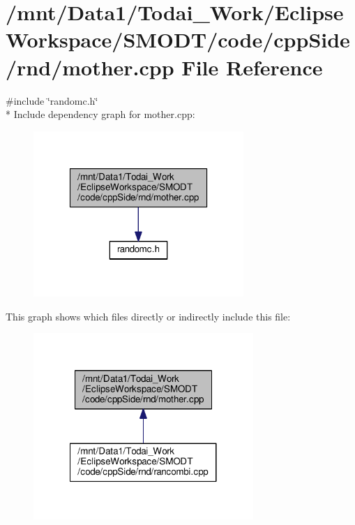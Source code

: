\section{/mnt/\-Data1/\-Todai\-\_\-\-Work/\-Eclipse\-Workspace/\-S\-M\-O\-D\-T/code/cpp\-Side/rnd/mother.cpp File Reference}
\label{rnd_2mother_8cpp}
{\ttfamily \#include \char`\"{}randomc.\-h\char`\"{}}\\*
Include dependency graph for mother.\-cpp\-:
\nopagebreak
\begin{figure}[H]
\begin{center}
\leavevmode
\includegraphics[width=226pt]{rnd_2mother_8cpp__incl}
\end{center}
\end{figure}
This graph shows which files directly or indirectly include this file\-:
\nopagebreak
\begin{figure}[H]
\begin{center}
\leavevmode
\includegraphics[width=236pt]{rnd_2mother_8cpp__dep__incl}
\end{center}
\end{figure}
